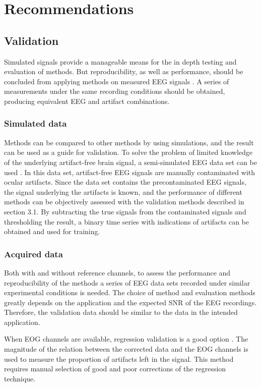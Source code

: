 \documentclass[twoside]{article}
\begin{document}
\section{Recommendations}

\subsection{Validation}
Simulated signals provide a manageable means for the in depth testing and evaluation of methods. But reproducibility, as well as performance, should be concluded from applying methods on measured EEG signals \cite{eegguidelines}. A series of measurements under the same recording conditions should be obtained, producing equivalent EEG and artifact combinations. 

\subsubsection{Simulated data}
Methods can be compared to other methods by using simulations, and the result can be used as a guide for validation. To solve the problem of limited knowledge of the underlying artifact-free brain signal, a semi-simulated EEG data set can be used \cite{simulateddata}. In this data set, artifact-free EEG signals are manually contaminated with ocular artifacts. Since the data set contains the precontaminated EEG signals, the signal underlying the artifacts is known, and the performance of different methods can be objectively assessed with the validation methods described in section 3.1. By subtracting the true signals from the contaminated signals and thresholding the result, a binary time series with indications of artifacts can be obtained and used for training. 



\subsubsection{Acquired data}
Both with and without reference channels, to assess the performance and reproducibility of the methods a series of EEG data sets recorded under similar experimental conditions is needed. The choice of method and evaluation methods greatly depends on the application and the expected SNR of the EEG recordings. Therefore, the validation data should be similar to the data in the intended application. 

When EOG channels are available, regression validation is a good option \cite{evaleog}. The magnitude of the relation between the corrected data and the EOG channels is used to measure the proportion of artifacts left in the signal. This method requires manual selection of good and poor corrections of the regression technique.  
\end{document}
